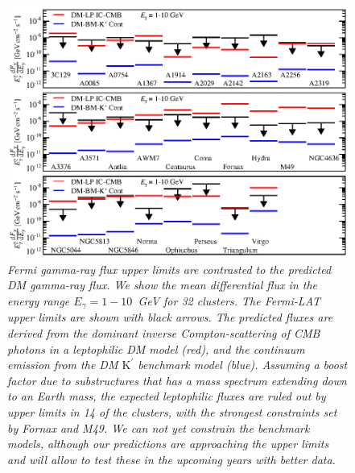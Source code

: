 \documentclass[10pt,aps,pra,reprint,amsmath,amsfonts,amssymb,showpacs,nofootinbib,floatfix]{revtex4-1}
\newcommand{\rmn}{\mathrm}
\newcommand{\Kp}{\rmn{K}^\prime}
\begin{document}
\begin{figure}
\begin{minipage}{2.0\columnwidth}
  \includegraphics[width=0.99\columnwidth]{figures/Fermi.comp.DM.eps}
  \caption{\it Fermi gamma-ray flux upper limits are contrasted to the
    predicted DM gamma-ray flux. We show the mean differential flux in
    the energy range $E_\gamma=1-10$~GeV for 32 clusters. The
    Fermi-LAT upper limits are shown with black arrows. The predicted
    fluxes are derived from the dominant inverse Compton-scattering of
    CMB photons in a leptophilic DM model (red), and the continuum
    emission from the DM $\Kp$ benchmark model (blue). Assuming a
    boost factor due to substructures that has a mass spectrum
    extending down to an Earth mass, the expected leptophilic fluxes
    are ruled out by upper limits in 14 of the clusters, with the
    strongest constraints set by Fornax and M49. We can not yet
    constrain the benchmark models, although our predictions are
    approaching the upper limits and will allow to test these in the
    upcoming years with better data.}
 \label{fig14}
\end{minipage}
\end{figure}
\end{document}
